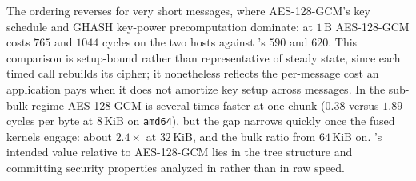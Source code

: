 The ordering reverses for very short messages, where AES-128-GCM's key schedule
and GHASH key-power precomputation dominate: at $1$\,B AES-128-GCM costs $765$
and $1044$ cycles on the two hosts against \TW{}'s $590$ and $620$. This
comparison is setup-bound rather than representative of steady state, since each
timed call rebuilds its cipher; it nonetheless reflects the per-message cost an
application pays when it does not amortize key setup across messages. In the
sub-bulk regime AES-128-GCM is several times faster at one chunk ($0.38$ versus
$1.89$ cycles per byte at $8$\,KiB on \texttt{amd64}), but the gap narrows
quickly once the fused kernels engage: about $2.4\times$ at $32$\,KiB, and the
bulk ratio from $64$\,KiB on. \TW{}'s intended value relative to AES-128-GCM
lies in the tree structure and committing security properties analyzed in
 rather than in raw speed.
